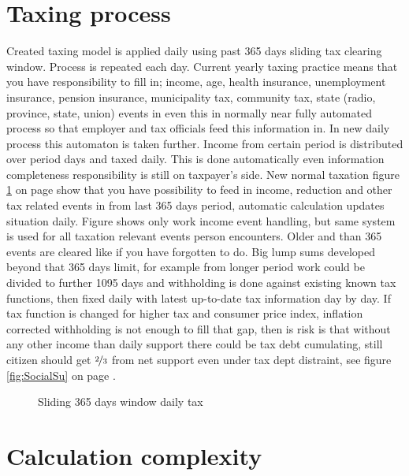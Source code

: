 \section{Taxing process}
\label{tax_process}
Created taxing model is applied daily using past 365 days sliding tax clearing window.
Process is repeated each day.
Current yearly taxing practice means that you have responsibility to fill in;
income, age, health insurance, unemployment insurance, pension insurance,
municipality tax, community tax, state (radio, province, state, union) events
in even this in normally near fully automated process so that employer
and tax officials feed this information in.
In new daily process this automaton is taken further.
Income from certain period is distributed over period days and taxed daily.
This is done automatically even information completeness responsibility is still on taxpayer's side.
New normal taxation figure \ref{fig:taxing} on page \pageref{fig:taxing}
show that you have possibility to feed in income, reduction
and other tax related events in from last 365 days period,
automatic calculation updates situation daily.
Figure shows only work income event handling,
but same system is used for all taxation relevant events person encounters.
Older and than 365 events are cleared like if you have forgotten to do.
Big lump sums developed beyond that 365 days limit,
for example from longer period work could be divided to further 1095 days
and withholding is done against existing known tax functions,
then fixed daily with latest up-to-date tax information day by day.
If tax function is changed for higher tax and consumer price index,
inflation corrected withholding is not enough to fill that gap,
then is risk is that without any other income than daily support there could be tax debt cumulating,
still citizen should get $\nicefrac{2}{3}$ from net support even under tax dept distraint,
see figure \ref{fig:SocialSu} on page \pageref{fig:SocialSu}.
\begin{figure} %
 \begin{center}
  \caption{Sliding 365 days window daily tax}
  \label{fig:taxing}
 \end{center}
\end{figure}

\section{Calculation complexity}
\label{calculation_complexity}

